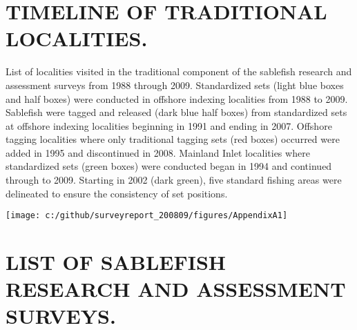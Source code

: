 \documentclass[12pt]{article}\usepackage[]{graphicx}\usepackage[]{color}
\begin{document}
\begin{appendices}

\clearpage

\section{TIMELINE OF TRADITIONAL LOCALITIES.}
\label{app:first-appendix}

List of localities visited in the traditional component of the sablefish research and assessment surveys from 1988 through 2009. Standardized sets (light blue boxes and half boxes) were conducted in offshore indexing localities from 1988 to 2009. Sablefish were tagged and released (dark blue half boxes) from standardized sets at offshore indexing localities beginning in 1991 and ending in 2007. Offshore tagging localities where only traditional tagging sets (red boxes) occurred were added in 1995 and discontinued in 2008. Mainland Inlet localities where standardized sets (green boxes) were conducted began in 1994 and continued through to 2009. Starting in 2002 (dark green), five standard fishing areas were delineated to ensure the consistency of set positions.
\begin{center}\texttt{[image: c:/github/surveyreport\_200809/figures/AppendixA1]} \end{center}
\clearpage

\section{LIST OF SABLEFISH RESEARCH AND ASSESSMENT SURVEYS.}
\label{app:second-appendix}


\end{appendices}
\end{document}
